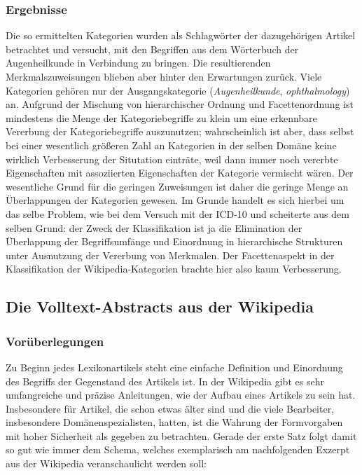 \documentclass[pagesize,DIV=calc,12pt,draft]{scrreprt}
\begin{document}
\subsubsection{Ergebnisse}

Die so ermittelten Kategorien wurden als Schlagwörter der dazugehörigen Artikel betrachtet und versucht, mit den Begriffen aus dem Wörterbuch der Augenheilkunde in Verbindung zu bringen. 
Die resultierenden Merkmalszuweisungen blieben aber hinter den Erwartungen zurück. 
Viele Kategorien gehören nur der Ausgangskategorie (\emph{Augenheilkunde}, \emph{ophthalmology}) an. 
Aufgrund der Mischung von hierarchischer Ordnung und Facettenordnung ist mindestens die Menge der Kategoriebegriffe zu klein um eine erkennbare Vererbung der Kategoriebegriffe auszunutzen; wahrscheinlich ist aber, dass selbst bei einer wesentlich größeren Zahl an Kategorien in der selben Domäne keine wirklich Verbesserung der Situtation einträte, weil dann immer noch vererbte Eigenschaften mit assoziierten Eigenschaften der Kategorie vermischt wären. 
Der wesentliche Grund für die geringen Zuweisungen ist daher die geringe Menge an Überlappungen der Kategorien gewesen. 
Im Grunde handelt es sich hierbei um das selbe Problem, wie bei dem Versuch mit der ICD-10 und scheiterte aus dem selben Grund: der Zweck der Klassifikation ist ja die Elimination der Überlappung der Begriffsumfänge und Einordnung in hierarchische Strukturen unter Ausnutzung der Vererbung von Merkmalen. 
Der Facettenaspekt in der Klassifikation der Wikipedia-Kategorien brachte hier also kaum Verbesserung. 

\subsection{Die Volltext-Abstracts aus der Wikipedia}

\subsubsection{Vorüberlegungen}

Zu Beginn jedes Lexikonartikels steht eine einfache Definition und Einordnung des Begriffs der Gegenstand des Artikels ist. 
In der Wikipedia gibt es sehr umfangreiche und präzise Anleitungen, wie der Aufbau eines Artikels zu sein hat. 
Insbesondere für Artikel, die schon etwas älter sind und die viele Bearbeiter, insbesondere Domänenspezialisten, hatten, ist die Wahrung der Formvorgaben mit hoher Sicherheit als gegeben zu betrachten. 
Gerade der erste Satz folgt damit so gut wie immer dem Schema, welches exemplarisch am nachfolgenden Exzerpt aus der Wikipedia veranschaulicht werden soll: 
\end{document}
